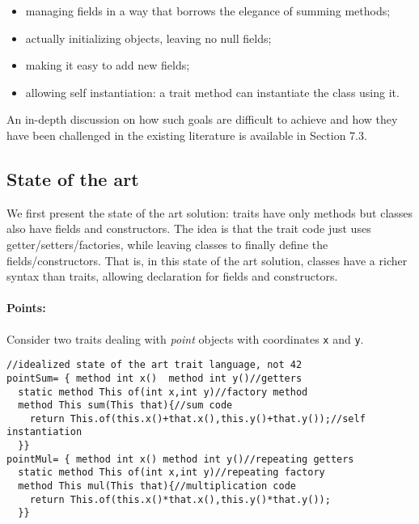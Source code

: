 \begin{itemize}
\item managing fields in a way that borrows the elegance of summing methods;
\item actually initializing objects, leaving no null fields;
\item making it easy to add new fields;
\item allowing self instantiation: a trait method can instantiate the class using it.
\end{itemize}
An in-depth discussion on how such goals are 
difficult to achieve and how they have been challenged
in the existing literature is available in Section 7.3.


\subsection{State of the art}


We first present the state of the art solution: 
traits have only methods but classes also have fields and constructors.
The idea is that the trait code just uses getter/setters/factories, while leaving
classes to finally define the fields/constructors. That
is, in this state of the art solution, classes have a richer syntax than traits, allowing
declaration for fields and constructors. 


\paragraph{Points:} Consider two 
traits dealing with \emph{point} objects with coordinates \lstinline{x} and
\lstinline{y}.

\begin{lstlisting}
//idealized state of the art trait language, not 42
pointSum= { method int x()  method int y()//getters
  static method This of(int x,int y)//factory method
  method This sum(This that){//sum code
    return This.of(this.x()+that.x(),this.y()+that.y());//self instantiation
  }}
pointMul= { method int x() method int y()//repeating getters
  static method This of(int x,int y)//repeating factory
  method This mul(This that){//multiplication code
    return This.of(this.x()*that.x(),this.y()*that.y());
  }}
\end{lstlisting}


